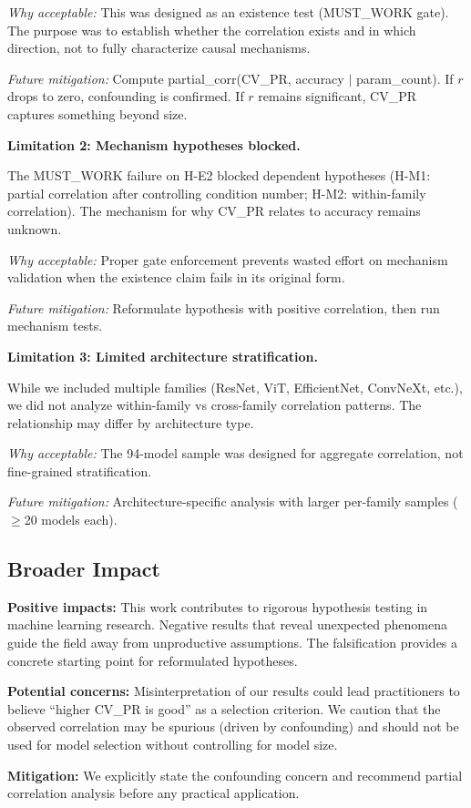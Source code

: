 \emph{Why acceptable:} This was designed as an existence test (MUST\_WORK gate). The purpose was to establish whether the correlation exists and in which direction, not to fully characterize causal mechanisms.

\emph{Future mitigation:} Compute partial\_corr(CV\_PR, accuracy $|$ param\_count). If $r$ drops to zero, confounding is confirmed. If $r$ remains significant, CV\_PR captures something beyond size.

\textbf{Limitation 2: Mechanism hypotheses blocked.}

The MUST\_WORK failure on H-E2 blocked dependent hypotheses (H-M1: partial correlation after controlling condition number; H-M2: within-family correlation). The mechanism for why CV\_PR relates to accuracy remains unknown.

\emph{Why acceptable:} Proper gate enforcement prevents wasted effort on mechanism validation when the existence claim fails in its original form.

\emph{Future mitigation:} Reformulate hypothesis with positive correlation, then run mechanism tests.

\textbf{Limitation 3: Limited architecture stratification.}

While we included multiple families (ResNet, ViT, EfficientNet, ConvNeXt, etc.), we did not analyze within-family vs cross-family correlation patterns. The relationship may differ by architecture type.

\emph{Why acceptable:} The 94-model sample was designed for aggregate correlation, not fine-grained stratification.

\emph{Future mitigation:} Architecture-specific analysis with larger per-family samples ($\geq$20 models each).

\subsection{Broader Impact}

\textbf{Positive impacts:} This work contributes to rigorous hypothesis testing in machine learning research. Negative results that reveal unexpected phenomena guide the field away from unproductive assumptions. The falsification provides a concrete starting point for reformulated hypotheses.

\textbf{Potential concerns:} Misinterpretation of our results could lead practitioners to believe ``higher CV\_PR is good'' as a selection criterion. We caution that the observed correlation may be spurious (driven by confounding) and should not be used for model selection without controlling for model size.

\textbf{Mitigation:} We explicitly state the confounding concern and recommend partial correlation analysis before any practical application.
